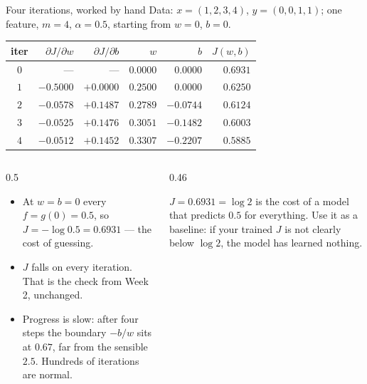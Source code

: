 \documentclass[aspectratio=169,10pt]{beamer}
\begin{document}
\begin{frame}{Four iterations, worked by hand}
  \footnotesize
  Data: $x = (1,2,3,4)$, $y = (0,0,1,1)$; one feature, $m=4$, $\alpha=0.5$, starting from
  $w=0$, $b=0$.
  \begin{center}\scriptsize
  \renewcommand{\arraystretch}{1.2}
  \begin{tabular}{@{}crrrrr@{}}
    \toprule
    iter & $\partial J/\partial w$ & $\partial J/\partial b$ & $w$ & $b$ & $J(w,b)$\\
    \midrule
    $0$ & --- & --- & $0.0000$ & $0.0000$ & $0.6931$\\
    $1$ & $-0.5000$ & $+0.0000$ & $0.2500$ & $0.0000$ & $0.6250$\\
    $2$ & $-0.0578$ & $+0.1487$ & $0.2789$ & $-0.0744$ & $0.6124$\\
    $3$ & $-0.0525$ & $+0.1476$ & $0.3051$ & $-0.1482$ & $0.6003$\\
    $4$ & $-0.0512$ & $+0.1452$ & $0.3307$ & $-0.2207$ & $0.5885$\\
    \bottomrule
  \end{tabular}
  \end{center}
  \vspace{1mm}
  \begin{columns}[T,onlytextwidth]
    \begin{column}{0.5\textwidth}
      \begin{itemize}
        \item At $w=b=0$ every $f=g(0)=0.5$, so $J=-\log 0.5 = 0.6931$ --- the cost of
              guessing.
        \item $J$ falls on every iteration. That is the check from Week 2, unchanged.
        \item Progress is slow: after four steps the boundary $-b/w$ sits at $0.67$, far from
              the sensible $2.5$. Hundreds of iterations are normal.
      \end{itemize}
    \end{column}
    \begin{column}{0.46\textwidth}
      \begin{keyidea}
        \footnotesize
        $J = 0.6931 = \log 2$ is the cost of a model that predicts $0.5$ for everything. Use
        it as a baseline: if your trained $J$ is not clearly below $\log 2$, the model has
        learned nothing.
      \end{keyidea}
    \end{column}
  \end{columns}
\end{frame}
\end{document}
